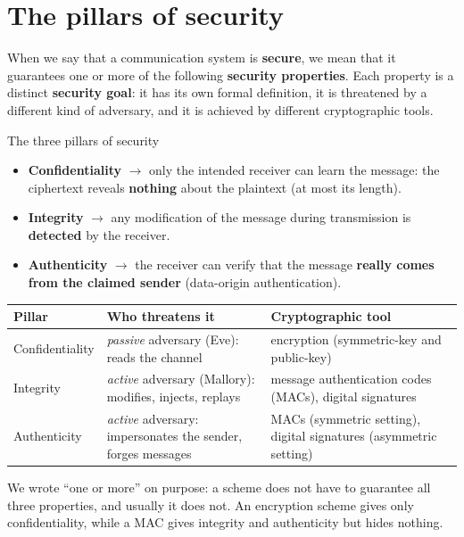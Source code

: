 \section{The pillars of security}\label{sec:pillars}

When we say that a communication system is \textbf{secure}, we mean that it guarantees one or more of the following \textbf{security properties}. Each property is a distinct \textbf{security goal}: it has its own formal definition, it is threatened by a different kind of adversary, and it is achieved by different cryptographic tools.

\begin{frameddefn}{The three pillars of security}
  \begin{itemize}
    \item \textbf{Confidentiality} $\to$ only the intended receiver can learn the message: the ciphertext reveals \textbf{nothing} about the plaintext (at most its length).
    \item \textbf{Integrity} $\to$ any modification of the message during transmission is \textbf{detected} by the receiver.
    \item \textbf{Authenticity} $\to$ the receiver can verify that the message \textbf{really comes from the claimed sender} (data-origin authentication).
  \end{itemize}
\end{frameddefn}

\begin{table}[H]
  \centering
  \small
  \begin{tabularx}{\textwidth}{@{}lXX@{}}
    \toprule
    \textbf{Pillar} & \textbf{Who threatens it} & \textbf{Cryptographic tool} \\
    \midrule
    Confidentiality & \textit{passive} adversary (Eve): reads the channel & encryption (symmetric-key and public-key) \\
    Integrity & \textit{active} adversary (Mallory): modifies, injects, replays & message authentication codes (MACs), digital signatures \\
    Authenticity & \textit{active} adversary: impersonates the sender, forges messages & MACs (symmetric setting), digital signatures (asymmetric setting) \\
    \bottomrule
  \end{tabularx}
\end{table}

We wrote ``one or more'' on purpose: a scheme does not have to guarantee all three properties, and usually it does not. An encryption scheme gives only confidentiality, while a MAC gives integrity and authenticity but hides nothing.


